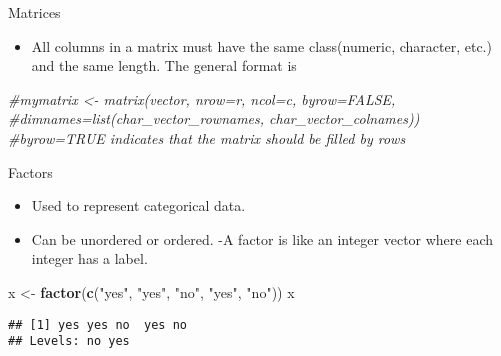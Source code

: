 \documentclass[
  ignorenonframetext,
]{beamer}
\newenvironment{Shaded}{\begin{snugshade}}{\end{snugshade}}
\newcommand{\CommentTok}[1]{\textcolor[rgb]{0.56,0.35,0.01}{\textit{#1}}}
\newcommand{\KeywordTok}[1]{\textcolor[rgb]{0.13,0.29,0.53}{\textbf{#1}}}
\newcommand{\NormalTok}[1]{#1}
\newcommand{\StringTok}[1]{\textcolor[rgb]{0.31,0.60,0.02}{#1}}
\providecommand{\tightlist}{%
  \setlength{\itemsep}{0pt}\setlength{\parskip}{0pt}}
\begin{document}
\begin{frame}[fragile]{Matrices}
\protect\hypertarget{matrices}{}

\begin{itemize}
\tightlist
\item
  All columns in a matrix must have the same class(numeric, character,
  etc.) and the same length. The general format is
\end{itemize}

\begin{Shaded}
\begin{Highlighting}[]
\CommentTok{#mymatrix <- matrix(vector, nrow=r, ncol=c, byrow=FALSE,}
\CommentTok{#dimnames=list(char_vector_rownames, char_vector_colnames)) }
\CommentTok{#byrow=TRUE indicates that the matrix should be filled by rows}
\end{Highlighting}
\end{Shaded}

\end{frame}

\begin{frame}[fragile]{Factors}
\protect\hypertarget{factors}{}

\begin{itemize}
\tightlist
\item
  Used to represent categorical data.
\item
  Can be unordered or ordered. -A factor is like an integer vector where
  each integer has a label.
\end{itemize}

\begin{Shaded}
\begin{Highlighting}[]
\NormalTok{  x <-}\StringTok{ }\KeywordTok{factor}\NormalTok{(}\KeywordTok{c}\NormalTok{(}\StringTok{"yes"}\NormalTok{, }\StringTok{"yes"}\NormalTok{, }\StringTok{"no"}\NormalTok{, }\StringTok{"yes"}\NormalTok{, }\StringTok{"no"}\NormalTok{))}
\NormalTok{  x}
\end{Highlighting}
\end{Shaded}

\begin{verbatim}
## [1] yes yes no  yes no 
## Levels: no yes
\end{verbatim}

\end{frame}
\end{document}
